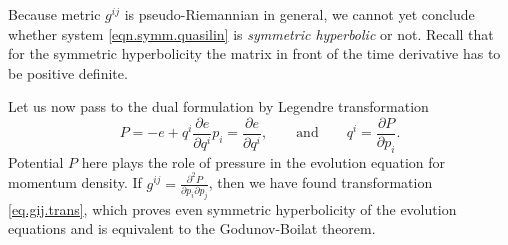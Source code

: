 \documentclass[
10pt, %
a4paper, %
oneside, %
headinclude,footinclude, %
BCOR5mm, %
]{scrartcl}
\newcommand{\MP}[1]{{\color{Green}MP:\ \ #1}}
\newcommand{\IP}[1]{{\color{Red}IP:\ \ #1}}
\begin{document}
Because metric $g^{ij}$ is pseudo-Riemannian in general, we cannot yet conclude whether system \eqref{eqn.symm.quasilin} is
\textit{symmetric hyperbolic} or not. Recall that for the symmetric hyperbolicity the matrix in front of the
time derivative has to be positive definite.


Let us now pass to the dual formulation by Legendre transformation
\begin{subequations}
\begin{equation}
    P = -e + q^i \frac{\partial e}{\partial q^i}
\end{equation}
\begin{equation}
    p_i = \frac{\partial e}{\partial q^i}, 
\qquad\mbox{and}\qquad
q^i = \frac{\partial P}{\partial p_i}.
\end{equation}
\end{subequations}
Potential $P$ here plays the role of pressure in the evolution equation for momentum density. 
If $g^{ij} = \frac{\partial^2 P}{\partial p_i \partial p_j}$, then we have found transformation \eqref{eq.gij.trans}, which proves even symmetric hyperbolicity of the evolution equations and is equivalent to the Godunov-Boilat theorem.



\end{document}
